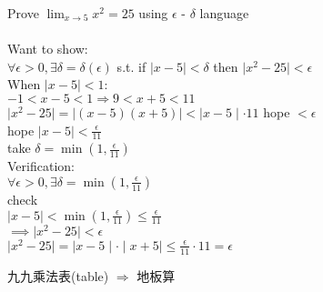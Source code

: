 \begin{eg}[]
Prove $\displaystyle \lim_{x \to 5} x^2 = 25$ using $\epsilon$ - $\delta$ language\\\\
Want to show:\\ $\forall \epsilon > 0, \exists \delta = \delta(\epsilon)$ s.t. if $\mid x-5 \mid < \delta$ then $\mid x^2 - 25 \mid < \epsilon$\\
When $\mid x-5 \mid <1$:\\
$-1 < x-5 < 1 \Rightarrow 9< x+5<11$\\
$\mid x^2 - 25 \mid = \mid (x-5)(x+5) \mid < \mid x-5 \mid \cdot 11$ hope $< \epsilon$\\
hope $\displaystyle \mid x-5 \mid < \frac{\epsilon}{11}$\\
take $\displaystyle \delta = \min(1, \frac{\epsilon}{11})$\\
Verification:\\
$\displaystyle \forall \epsilon > 0, \exists \delta = \min (1, \frac{\epsilon}{11})$\\
check \\
$\displaystyle \mid x-5 \mid < \min(1, \frac{\epsilon}{11}) \leq \frac{\epsilon}{11}$\\
$\displaystyle \implies \mid x^2 -25 \mid < \epsilon$\\
$\displaystyle \mid x^2 -25 \mid = \mid x-5 \mid \cdot \mid x+5 \mid \leq \frac{\epsilon}{11} \cdot 11 = \epsilon$
\end{eg}

\begin{jk}{}
九九乘法表(table) $\Rightarrow$ 地板算
\end{jk}
